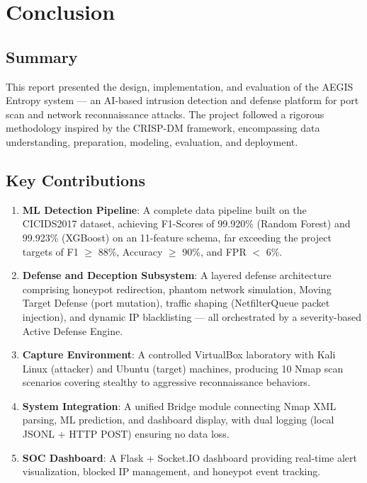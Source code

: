 
\chapter{Conclusion}\label{ch:conclusion}

\section{Summary}

This report presented the design, implementation, and evaluation of the AEGIS Entropy system --- an AI-based intrusion detection and defense platform for port scan and network reconnaissance attacks. The project followed a rigorous methodology inspired by the CRISP-DM framework, encompassing data understanding, preparation, modeling, evaluation, and deployment.

\section{Key Contributions}

\begin{enumerate}
    \item \textbf{ML Detection Pipeline}: A complete data pipeline built on the CICIDS2017 dataset, achieving F1-Scores of 99.920\% (Random Forest) and 99.923\% (XGBoost) on an 11-feature schema, far exceeding the project targets of F1 $\geq$ 88\%, Accuracy $\geq$ 90\%, and FPR $<$ 6\%.

    \item \textbf{Defense and Deception Subsystem}: A layered defense architecture comprising honeypot redirection, phantom network simulation, Moving Target Defense (port mutation), traffic shaping (NetfilterQueue packet injection), and dynamic IP blacklisting --- all orchestrated by a severity-based Active Defense Engine.

    \item \textbf{Capture Environment}: A controlled VirtualBox laboratory with Kali Linux (attacker) and Ubuntu (target) machines, producing 10 Nmap scan scenarios covering stealthy to aggressive reconnaissance behaviors.

    \item \textbf{System Integration}: A unified Bridge module connecting Nmap XML parsing, ML prediction, and dashboard display, with dual logging (local JSONL + HTTP POST) ensuring no data loss.

    \item \textbf{SOC Dashboard}: A Flask + Socket.IO dashboard providing real-time alert visualization, blocked IP management, and honeypot event tracking.
\end{enumerate}

